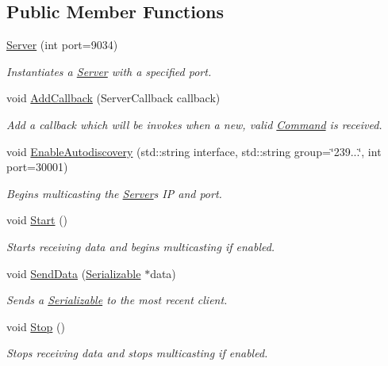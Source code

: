 \subsection*{Public Member Functions}
\begin{DoxyCompactItemize}
\item 
\hyperlink{classrbp_1_1Server_aeabc2e895aeae85e9d34acc6c3b2bc8f}{Server} (int port=9034)
\begin{DoxyCompactList}\small\item\em Instantiates a \hyperlink{classrbp_1_1Server}{Server} with a specified port. \end{DoxyCompactList}\item 
void \hyperlink{classrbp_1_1Server_a37deb0bbb0098f2148e7c21d6764c79a}{Add\+Callback} (Server\+Callback callback)
\begin{DoxyCompactList}\small\item\em Add a callback which will be invokes when a new, valid \hyperlink{classrbp_1_1Command}{Command} is received. \end{DoxyCompactList}\item 
void \hyperlink{classrbp_1_1Server_aab0491afac0864f0677766101b069778}{Enable\+Autodiscovery} (std\+::string interface, std\+::string group=\char`\"{}239...\char`\"{}, int port=30001)
\begin{DoxyCompactList}\small\item\em Begins multicasting the \hyperlink{classrbp_1_1Server}{Server}\textquotesingle{}s I\+P and port. \end{DoxyCompactList}\item 
\hypertarget{classrbp_1_1Server_a64d00e53482b431692144df3fdc2b445}{}void \hyperlink{classrbp_1_1Server_a64d00e53482b431692144df3fdc2b445}{Start} ()\label{classrbp_1_1Server_a64d00e53482b431692144df3fdc2b445}

\begin{DoxyCompactList}\small\item\em Starts receiving data and begins multicasting if enabled. \end{DoxyCompactList}\item 
void \hyperlink{classrbp_1_1Server_a250e72cfa217fb8d6a31593f0eca6276}{Send\+Data} (\hyperlink{classrbp_1_1Serializable}{Serializable} $\ast$data)
\begin{DoxyCompactList}\small\item\em Sends a \hyperlink{classrbp_1_1Serializable}{Serializable} to the most recent client. \end{DoxyCompactList}\item 
\hypertarget{classrbp_1_1Server_a6a085077d0b2f48443428aa01e753798}{}void \hyperlink{classrbp_1_1Server_a6a085077d0b2f48443428aa01e753798}{Stop} ()\label{classrbp_1_1Server_a6a085077d0b2f48443428aa01e753798}

\begin{DoxyCompactList}\small\item\em Stops receiving data and stops multicasting if enabled. \end{DoxyCompactList}\end{DoxyCompactItemize}


